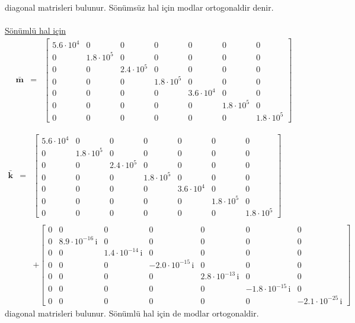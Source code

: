 \documentclass[a4paper]{report}
\begin{document}
diagonal matrisleri bulunur. Sönümsüz hal için modlar ortogonaldir denir.
\\
~\\
\underline{Sönümlü hal için}\\
\begin{eqnarray*}
\bar{ \mathbf{m}}&=&\left[\begin{array}{ccccccc} 5.6\cdot 10^4 & 0 & 0 & 0 & 0 & 0 & 0\\ 0 & 1.8\cdot 10^5& 0 & 0 & 0 & 0 & 0\\ 0 & 0 & 2.4\cdot 10^5  & 0 & 0 & 0 & 0\\ 0 & 0 & 0 & 1.8\cdot 10^5 & 0 & 0 & 0\\ 0 & 0 & 0 & 0 & 3.6\cdot 10^4 & 0 & 0\\ 0 & 0 & 0 & 0 & 0 & 1.8\cdot 10^5  & 0\\ 0 & 0 & 0 & 0 & 0 & 0 & 1.8\cdot 10^5  \end{array}\right]
\end{eqnarray*}

\begin{eqnarray*}
\bar{ \mathbf{k} }&=&\left[\begin{array}{ccccccc} 5.6\cdot 10^4 & 0 & 0 & 0 & 0 & 0 & 0\\ 0 & 1.8\cdot 10^5  & 0 & 0 & 0 & 0 & 0\\ 0 & 0 & 2.4\cdot 10^5 & 0 & 0 & 0 & 0\\ 0 & 0 & 0 & 1.8\cdot 10^5  & 0 & 0 & 0\\ 0 & 0 & 0 & 0 & 3.6\cdot 10^4  & 0 & 0\\ 0 & 0 & 0 & 0 & 0 & 1.8\cdot 10^5 & 0\\ 0 & 0 & 0 & 0 & 0 & 0 & 1.8\cdot 10^5  \end{array}\right]\\
&&\\
&&+\left[\begin{array}{ccccccc} 0 & 0 & 0 & 0 & 0 & 0 & 0\\ 0 &  8.9\cdot 10^{-16}\, \mathrm{i} & 0 & 0 & 0 & 0 & 0\\ 0 & 0 &  1.4\cdot 10^{-14}\, \mathrm{i} & 0 & 0 & 0 & 0\\ 0 & 0 & 0 & - 2.0\cdot 10^{-15}\, \mathrm{i} & 0 & 0 & 0\\ 0 & 0 & 0 & 0 &  2.8\cdot 10^{-13}\, \mathrm{i} & 0 & 0\\ 0 & 0 & 0 & 0 & 0 & - 1.8\cdot 10^{-15}\, \mathrm{i} & 0\\ 0 & 0 & 0 & 0 & 0 & 0 & - 2.1\cdot 10^{-25}\, \mathrm{i} \end{array}\right]
\end{eqnarray*}
diagonal matrisleri bulunur. Sönümlü hal için de modlar ortogonaldir.
\end{document}
